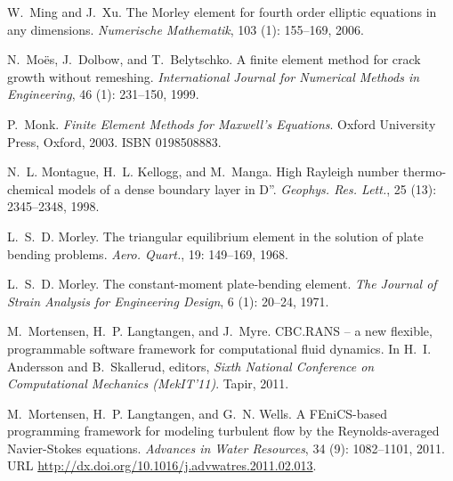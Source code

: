 \begin{thebibliography}{467}
W.~Ming and J.~Xu.
\newblock The {M}orley element for fourth order elliptic equations in any
  dimensions.
\newblock \emph{Numerische Mathematik}, 103 (1): 155--169,
  2006.

N.~Mo\"es, J.~Dolbow, and T.~Belytschko.
\newblock A finite element method for crack growth without remeshing.
\newblock \emph{International Journal for Numerical Methods in Engineering},
  46 (1): 231--150, 1999.

P.~Monk.
\newblock \emph{Finite Element Methods for {M}axwell's Equations}.
\newblock Oxford University Press, Oxford, 2003.
\newblock ISBN 0198508883.

N.~L. Montague, H.~L. Kellogg, and M.~Manga.
\newblock High {R}ayleigh number thermo-chemical models of a dense boundary
  layer in {D''}.
\newblock \emph{Geophys. Res. Lett.}, 25 (13): 2345--2348,
  1998.

L.~S.~D. Morley.
\newblock The triangular equilibrium element in the solution of plate bending
  problems.
\newblock \emph{Aero. Quart.}, 19: 149--169, 1968.

L.~S.~D. Morley.
\newblock The constant-moment plate-bending element.
\newblock \emph{The Journal of Strain Analysis for Engineering Design},
  6 (1): 20--24, 1971.

M.~Mortensen, H.~P. Langtangen, and J.~Myre.
\newblock CBC.RANS -- a new flexible, programmable software framework for
  computational fluid dynamics.
\newblock In H.~I. Andersson and B.~Skallerud, editors, \emph{Sixth National
  Conference on Computational Mechanics (MekIT'11)}. Tapir, 2011.

M.~Mortensen, H.~P. Langtangen, and G.~N. Wells.
\newblock A {FEniCS}-based programming framework for modeling turbulent flow by
  the {Reynolds}-averaged {Navier-Stokes} equations.
\newblock \emph{Advances in Water Resources}, 34 (9):  1082--1101, 2011.
\newblock URL \url{http://dx.doi.org/10.1016/j.advwatres.2011.02.013}.


\end{thebibliography}
